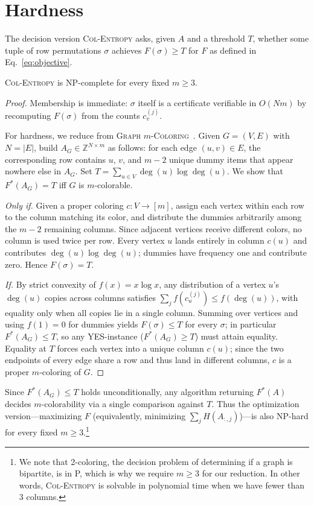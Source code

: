 \section{Hardness}
\label{sec:hardness}

The decision version \textsc{Col-Entropy} asks, given $A$ and a threshold $T$,
whether some tuple of row permutations $\sigma$ achieves $F(\sigma) \geq T$
for $F$ as defined in Eq.~\eqref{eq:objective}.

\begin{theorem}\label{thm:np-complete}
\textsc{Col-Entropy} is NP-complete for every fixed $m \geq 3$.
\end{theorem}

\begin{proof}
Membership is immediate: $\sigma$ itself is a certificate verifiable in
$O(Nm)$ by recomputing $F(\sigma)$ from the counts $c_v^{(j)}$.

For hardness, we reduce from \textsc{Graph $m$-Coloring}~\cite{karp1972}.
Given $G = (V, E)$ with $N = |E|$, build $A_G \in \mathbb{Z}^{N \times m}$ as
follows: for each edge $(u, v) \in E$, the corresponding row contains $u$,
$v$, and $m - 2$ unique dummy items that appear nowhere else in $A_G$. Set
$T = \sum_{u \in V} \deg(u) \log \deg(u)$. We show that $F^\ast(A_G) = T$ iff
$G$ is $m$-colorable.

\emph{Only if.} Given a proper coloring $c : V \to [m]$, assign each vertex
within each row to the column matching its color, and distribute the dummies
arbitrarily among the $m - 2$ remaining columns. Since adjacent vertices
receive different colors, no column is used twice per row. Every vertex $u$
lands entirely in column $c(u)$ and contributes $\deg(u) \log \deg(u)$;
dummies have frequency one and contribute zero. Hence $F(\sigma) = T$.

\emph{If.} By strict convexity of $f(x) = x \log x$, any distribution of a
vertex $u$'s $\deg(u)$ copies across columns satisfies
$\sum_j f(c_u^{(j)}) \leq f(\deg(u))$, with equality only when all copies lie
in a single column. Summing over vertices and using $f(1) = 0$ for dummies
yields $F(\sigma) \leq T$ for every $\sigma$; in particular $F^\ast(A_G) \leq T$,
so any YES-instance ($F^\ast(A_G) \geq T$) must attain equality. Equality at
$T$ forces each vertex into a unique column $c(u)$; since the two endpoints
of every edge share a row and thus land in different columns, $c$ is a proper
$m$-coloring of $G$.
\end{proof}

Since $F^\ast(A_G) \leq T$ holds unconditionally, any algorithm returning
$F^\ast(A)$ decides $m$-colorability via a single comparison against $T$.
Thus the optimization version---maximizing $F$ (equivalently, minimizing
$\sum_j H(A_{:,j})$)---is also NP-hard for every fixed $m \geq 3$.\footnote{We note that 2-coloring, the decision problem of determining if a graph is bipartite, is in P, which is why we require $m \ge 3$ for our reduction. In other words, \textsc{Col-Entropy} is solvable in polynomial time when we have fewer than 3 columns.} 

